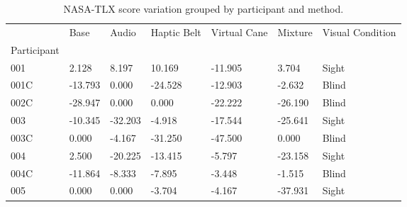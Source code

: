 
\begin{table}[!htb]
\centering
\caption{NASA-TLX score variation grouped by participant and method.}
\label{tab:nasa_var}
\begin{tabular}{lllllll}
\toprule
{} &    Base &   Audio &  Haptic Belt &  Virtual Cane &  Mixture & Visual Condition \\
Participant &         &         &              &               &          &                  \\
\midrule
001         &   2.128 &   8.197 &       10.169 &       -11.905 &    3.704 &            Sight \\
001C        & -13.793 &   0.000 &      -24.528 &       -12.903 &   -2.632 &            Blind \\
002C        & -28.947 &   0.000 &        0.000 &       -22.222 &  -26.190 &            Blind \\
003         & -10.345 & -32.203 &       -4.918 &       -17.544 &  -25.641 &            Sight \\
003C        &   0.000 &  -4.167 &      -31.250 &       -47.500 &    0.000 &            Blind \\
004         &   2.500 & -20.225 &      -13.415 &        -5.797 &  -23.158 &            Sight \\
004C        & -11.864 &  -8.333 &       -7.895 &        -3.448 &   -1.515 &            Blind \\
005         &   0.000 &   0.000 &       -3.704 &        -4.167 &  -37.931 &            Sight \\
\bottomrule
\end{tabular}
\end{table}

